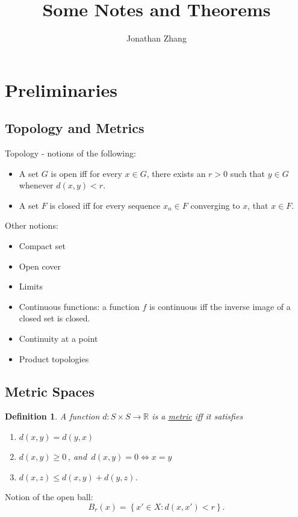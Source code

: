 \documentclass[letterpaper,twoside,11pt]{article}
\theoremstyle{mystyle}
\newtheorem{definition}{Definition}[section]
\newcommand{\R}{{\mathbb R}}
\begin{document}
\title{\vspace{-2\baselineskip} 
Some Notes and Theorems
}
\author{Jonathan Zhang}
\date{}
\maketitle


\section{Preliminaries}
\subsection{Topology and Metrics}
Topology - notions of the following: 
\begin{itemize}
\item A set $G$ is open iff for every $x\in G$, there exists an $r>0$ such that $y\in G$ whenever $d(x, y) < r$. 
\item A set $F$ is closed iff for every sequence $x_n\in F$ converging to $x$, that $x\in F$. 
\end{itemize}
Other notions: 
\begin{itemize}
\item Compact set
\item Open cover
\item Limits
\item Continuous functions: a function $f$ is continuous iff the inverse image of a closed set is closed. 
\item Continuity at a point
\item Product topologies
\end{itemize}

\subsection*{Metric Spaces}
\begin{definition}
A function $d: S\times S \to \R$ is a \underline{metric} iff it satisfies
\begin{enumerate}
\item $d(x, y) = d(y, x)$
\item $d(x,y)\geq 0\,$, and $\,d(x,y) = 0 \Leftrightarrow x = y$
\item $d(x, z) \leq d(x, y) + d(y, z)$. 
\end{enumerate}
\end{definition}
Notion of the open ball: 
\[{B_r}\left( x \right) = \left\{ {x' \in X:d\left( {x,x'} \right) < r} \right\}.\]
\end{document}
